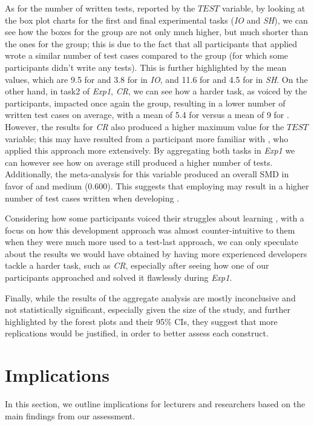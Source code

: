 As for the number of written tests, reported by the $TEST$ variable, by looking at the box plot charts for the first and final experimental tasks (\ie \textit{IO} and \textit{SH}), we can see how the boxes for the \tdd group are not only much higher, but much shorter than the ones for the \notdd group; this is due to the fact that all participants that applied \tdd wrote a similar number of test cases compared to the \notdd group (for which some participants didn't write any tests).
This is further highlighted by the mean values, which are 9.5 for \tdd and 3.8 for \notdd in \textit{IO}, and 11.6 for \tdd and 4.5 for \notdd in \textit{SH}.
On the other hand, in task2 of \textit{Exp1}, \textit{CR}, we can see how a harder task, as voiced by the participants, impacted once again the \tdd group, resulting in a lower number of written test cases on average, with a mean of 5.4 for \tdd versus a mean of 9 for \notdd. However, the results for \textit{CR} also produced a higher maximum value for the $TEST$ variable; this may have resulted from a participant more familiar with \tdd, who applied this approach more extensively.
By aggregating both tasks in \textit{Exp1} we can however see how on average \tdd still produced a higher number of tests.
Additionally, the meta-analysis for this variable produced an overall SMD in favor of \tdd and medium (0.600).
This suggests that employing \tdd may result in a higher number of test cases written when developing \ess.

Considering how some participants voiced their struggles about learning \tdd, with a focus on how this development approach was almost counter-intuitive to them when they were much more used to a test-last approach, we can only speculate about the results we would have obtained by having more experienced developers tackle a harder task, such as \textit{CR}, especially after seeing how one of our participants approached and solved it flawlessly during \textit{Exp1}.

Finally, while the results of the aggregate analysis are mostly inconclusive and not statistically significant, especially given the size of the study, and further highlighted by the forest plots and their 95\% CIs, they suggest that more replications would be justified, in order to better assess each construct.

\newpage
\section{Implications}
In this section, we outline implications for lecturers and researchers based on the main findings from our assessment. 

